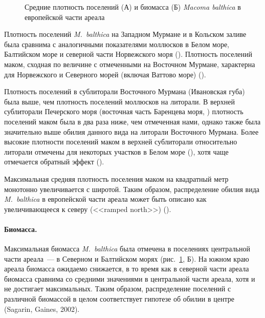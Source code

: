 {\begin{figure}[]
\begin{minipage}[b]{.5\linewidth}
\begin{center}
			\end{center}
		\end{minipage}
	\caption{Средние плотность поселений (А) и биомасса (Б) {\it Macoma balthica} в европейской части ареала}
	\label{ris:NB_areal}
	\end{figure}
Плотность поселений {\it M.~balthica} на Западном Мурмане и в Кольском заливе была сравнима с аналогичными показателями моллюсков в Белом море, Балтийском море и северной части Норвежского моря (\cite{Semenova_1974, Aschan_1988, Maximovich_et_al_1991, Bonsdorff_et_al_1995, Bostrom_Bonsdorff_2000, Oug_2001, Laine_et_al_2003, Khaitov_et_al_2007, Varfolomeeva_Naumov_2013}).
Плотность поселений маком, сходная по величине с отмеченными на Восточном Мурмане, характерна для Норвежского и Северного морей (включая Ваттово море) (\cite{Brady_1943, Sneli_1968, Stromgren_et_al_1973, Beukema_1976, Jensen_Jensen_1985, Jensen_et_al_1985, Madsen_Jensen_1987, Beukema_1979, Zwarts_Wanink_1993, Reise_et_al_1994}).

Плотность поселений в сублиторали Восточного Мурмана (Ивановская губа) была выше, чем плотность поселений моллюсков на литорали.
В верхней сублиторали Печерского моря (восточная часть Баренцева моря, \cite{Denisenko_et_al_2003}) плотность поселений маком была в два раза ниже, чем отмеченная нами, однако также была значительно выше обилия данного вида на литорали Восточного Мурмана.
Более высокие плотности поселений маком в верхней сублиторали относительно литорали отмечены для некоторых участков в Белом море (\cite{Semenova_1974}), хотя чаще отмечается обратный эффект (\cite{Semenova_1974, Maximovich_et_al_1991}).

Максимальная средняя плотность поселения маком на квадратный метр монотонно увеличивается с широтой.
Таким образом, распределение обилия вида {\it M.~balthica} в европейской части ареала может быть описано как увеличивающееся к северу (<<ramped north>>) (\cite{Sagarin_Gaines_2002}).

\paragraph{Биомасса.}
Максимальная биомасса \textit{M.~balthica} была отмечена в поселениях центральной части ареала~--- в Северном и Балтийском морях (рис.~\ref{ris:NB_areal}, Б).
На южном краю ареала биомасса ожидаемо снижается, в то время как в северной части ареала биомасса сравнима со средними значениями в центральной части ареала, хотя и не достигает максимальных.
Таким образом, распределение поселений с различной биомассой в целом соответствует гипотезе об обилии в центре (Sagarin, Gaines, 2002).

}
